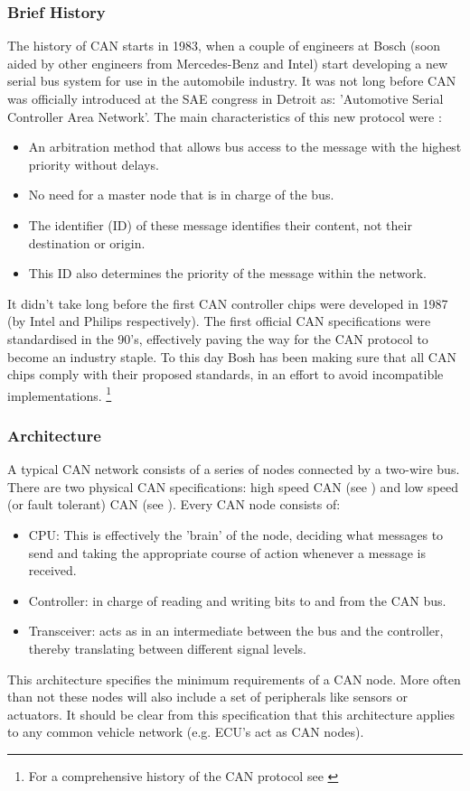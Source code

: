\subsubsection{Brief History} 
\label{subsec:can:briefhistory}

The history of CAN starts in 1983, when a couple of engineers at Bosch (soon aided by other engineers from Mercedes-Benz and Intel) start developing a new serial bus system for use in the automobile industry. It was not long before CAN was officially introduced at the SAE congress in Detroit as: 'Automotive Serial Controller Area Network'. The main characteristics of this new protocol were \cite{CANhistory}: 
\begin{itemize}
	\item An arbitration method that allows bus access to the message with the highest priority without delays.
	\item No need for a master node that is in charge of the bus.
	\item The identifier (ID) of these message identifies their content, not their destination or origin.
	\item This ID also determines the priority of the message within the network.
\end{itemize}
It didn't take long before the first CAN controller chips were developed in 1987 (by Intel and Philips respectively). The first official CAN specifications were standardised in the 90's, effectively paving the way for the CAN protocol to become an industry staple. To this day Bosh has been making sure that all CAN chips comply with their proposed standards, in an effort to avoid incompatible implementations. \footnote{For a comprehensive history of the CAN protocol see \cite{CANhistory}}

\subsubsection{Architecture}
\label{subsec:can:architecture}

A typical CAN network consists of a series of nodes connected by a two-wire bus. There are two physical CAN specifications: high speed CAN (see \cite{ISO11898-2}) and low speed (or fault tolerant) CAN (see \cite{ISO11898-3}). Every CAN node consists of:
\begin{itemize}
	\item CPU: This is effectively the 'brain' of the node, deciding what messages to send and taking the appropriate course of action whenever a message is received.
	\item Controller: in charge of reading and writing bits to and from the CAN bus.
	\item Transceiver: acts as in an intermediate between the bus and the controller, thereby translating between different signal levels.
\end{itemize}
This architecture specifies the minimum requirements of a CAN node. More often than not these nodes will also include a set of peripherals like sensors or actuators. It should be clear from this specification that this architecture applies to any common vehicle network (e.g. ECU's act as CAN nodes).

